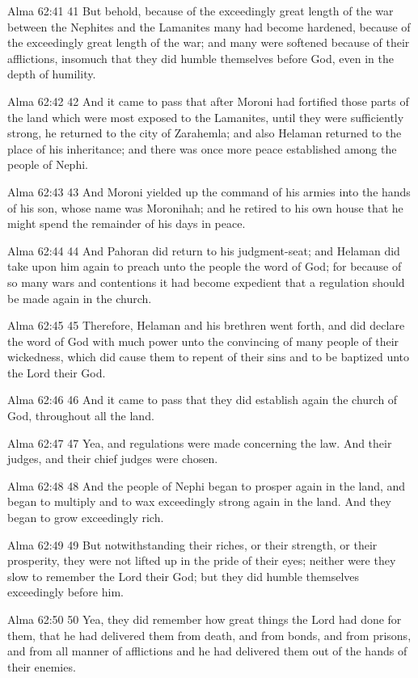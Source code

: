 Alma 62:41
 41 But behold, because of the exceedingly great length of the
war between the Nephites and the Lamanites many had become
hardened, because of the exceedingly great length of the war; and
many were softened because of their afflictions, insomuch that
they did humble themselves before God, even in the depth of
humility.

Alma 62:42
 42 And it came to pass that after Moroni had fortified those
parts of the land which were most exposed to the Lamanites, until
they were sufficiently strong, he returned to the city of
Zarahemla; and also Helaman returned to the place of his
inheritance; and there was once more peace established among the
people of Nephi.

Alma 62:43
 43 And Moroni yielded up the command of his armies into the
hands of his son, whose name was Moronihah; and he retired to his
own house that he might spend the remainder of his days in peace.

Alma 62:44
 44 And Pahoran did return to his judgment-seat; and Helaman did
take upon him again to preach unto the people the word of God;
for because of so many wars and contentions it had become
expedient that a regulation should be made again in the church.

Alma 62:45
 45 Therefore, Helaman and his brethren went forth, and did
declare the word of God with much power unto the convincing of
many people of their wickedness, which did cause them to repent
of their sins and to be baptized unto the Lord their God.

Alma 62:46
 46 And it came to pass that they did establish again the church
of God, throughout all the land.

Alma 62:47
 47 Yea, and regulations were made concerning the law. And their
judges, and their chief judges were chosen.

Alma 62:48
 48 And the people of Nephi began to prosper again in the land,
and began to multiply and to wax exceedingly strong again in the
land. And they began to grow exceedingly rich.

Alma 62:49
 49 But notwithstanding their riches, or their strength, or their
prosperity, they were not lifted up in the pride of their eyes;
neither were they slow to remember the Lord their God; but they
did humble themselves exceedingly before him.

Alma 62:50
 50 Yea, they did remember how great things the Lord had done for
them, that he had delivered them from death, and from bonds, and
from prisons, and from all manner of afflictions and he had
delivered them out of the hands of their enemies.

